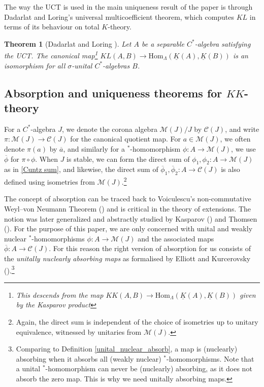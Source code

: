 \documentclass[reqno]{amsart}
\newtheorem{thm}{Theorem}[section]
\theoremstyle{definition}
\theoremstyle{remark}
\numberwithin{equation}{section}
\theoremstyle{definition}
\newcommand{\calC}{\mathcal{C}}
\newcommand{\calM}{\mathcal{M}}
\begin{document}
The way the UCT is used in the main uniqueness result of the paper is through Dadarlat and Loring's universal multicoefficient theorem, which computes $KL$ in terms of its behaviour on total $K$-theory.
\begin{thm}[Dadarlat and Loring {\cite{Dadarlet-Loring}}]\label{UMCT}
    Let $A$ be a separable $C^*$-algebra satisfying the UCT. The canonical map\footnote{This descends from the map $KK(A,B)\to\mathrm{Hom}_{\Lambda}(\underline{K}(A),\underline{K}(B))$ given by the Kasparov product} $KL(A,B)\to \mathrm{Hom}_{\Lambda}(\underline{K}(A),\underline{K}(B))$ is an isomorphism for all $\sigma$-unital $C^*$-algebras $B$.
\end{thm}

\subsection{Absorption and uniqueness theorems for $KK$-theory} 
\label{KL_section} 
For a $C^*$-algebra $J$, we denote the corona algebra $\calM(J)/J$ by $\calC(J)$, and write $\pi: \calM(J)\rightarrow \calC(J)$ for the canonical quotient map. For $a\in \calM(J)$, we often denote $\pi(a)$ by $\overline{a}$, and similarly for a $^*$-homomorphism $\phi: A\rightarrow \calM(J)$, we use $\overline{\phi}$ for $\pi \circ \phi$. When $J$ is stable, we can form the direct sum of $\phi_{1}, \phi_{2}: A\rightarrow \calM(J)$ as in \eqref{Cuntz sum}, and likewise, the direct sum of $\overline{\phi}_{1}, \overline{\phi}_{2}: A\rightarrow \calC(J)$ is also defined using isometries from $\calM(J)$.\footnote{Again, the direct sum is independent of the choice of isometries up to unitary equivalence, witnessed by unitaries from $\calM(J)$.} 

The concept of absorption can be traced back to Voiculescu's non-commutative Weyl–von Neumann Theorem (\cite{Voiculescu}) and is critical in the theory of extensions. The notion was later generalized and abstractly studied by Kasparov (\cite{Kasparov_1980}) and Thomsen (\cite{Thomsen}). For the purpose of this paper, we are only concerned with unital and weakly nuclear $^*$-homomorphisms $\phi: A\rightarrow \calM(J)$ and the associated maps $\overline{\phi}:A\to\mathcal C(J)$. For this reason the right version of absorption for us consists of the \emph{unitally nuclearly absorbing maps} as formalised by Elliott and Kurcerovsky (\cite[Definition 5]{EK.PJM}).\footnote{\label{unital_absorb-fn}Comparing to Definition \ref{unital_nuclear_absorb}, a map is (nuclearly) absorbing when it absorbs all (weakly nuclear) $^*$-homomorphisms. Note that a unital $^*$-homomorphism can never be (nuclearly) absorbing, as it does not absorb the zero map. This is why we need unitally absorbing maps.} 
\end{document}

